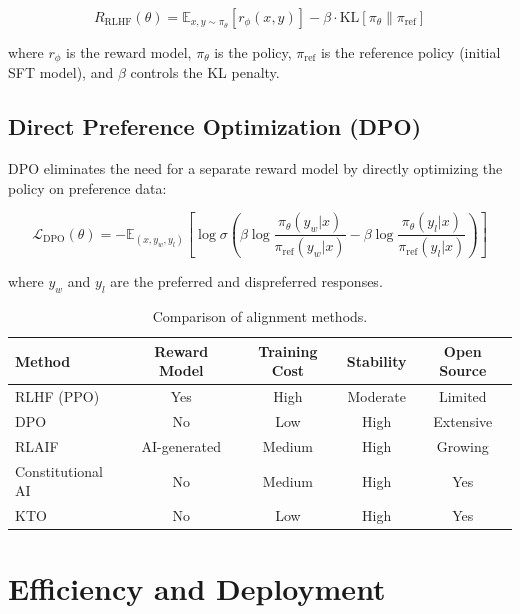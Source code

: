 \documentclass[
    language=english,
    doctype=review-article,
    institution=none,
]{../../omnilatex}
\begin{document}
\begin{equation}
    R_{\text{RLHF}}(\theta) = \mathbb{E}_{x,y \sim \pi_\theta}\left[r_\phi(x, y)\right] - \beta \cdot \text{KL}\left[\pi_\theta \| \pi_{\text{ref}}\right]
    \label{eq:rlhf}
\end{equation}

where $r_\phi$ is the reward model, $\pi_\theta$ is the policy, $\pi_{\text{ref}}$
is the reference policy (initial SFT model), and $\beta$ controls the KL
penalty.

\subsection{Direct Preference Optimization (DPO)}

DPO \cite{rafailov2023direct} eliminates the need for a separate reward model
by directly optimizing the policy on preference data:

\begin{equation}
    \mathcal{L}_{\text{DPO}}(\theta) = -\mathbb{E}_{(x, y_w, y_l)}\left[\log \sigma\left(\beta \log \frac{\pi_\theta(y_w|x)}{\pi_{\text{ref}}(y_w|x)} - \beta \log \frac{\pi_\theta(y_l|x)}{\pi_{\text{ref}}(y_l|x)}\right)\right]
    \label{eq:dpo}
\end{equation}

where $y_w$ and $y_l$ are the preferred and dispreferred responses.

\begin{table}[htbp]
    \centering
    \caption{Comparison of alignment methods.}
    \label{tab:alignment}
    \begin{tabular}{@{}lcccc@{}}
        \toprule
        Method & Reward Model & Training Cost & Stability & Open Source \\
        \midrule
        RLHF (PPO) & Yes & High & Moderate & Limited \\
        DPO & No & Low & High & Extensive \\
        RLAIF & AI-generated & Medium & High & Growing \\
        Constitutional AI & No & Medium & High & Yes \\
        KTO & No & Low & High & Yes \\
        \bottomrule
    \end{tabular}
\end{table}

\section{Efficiency and Deployment}
\label{sec:efficiency}
\end{document}
